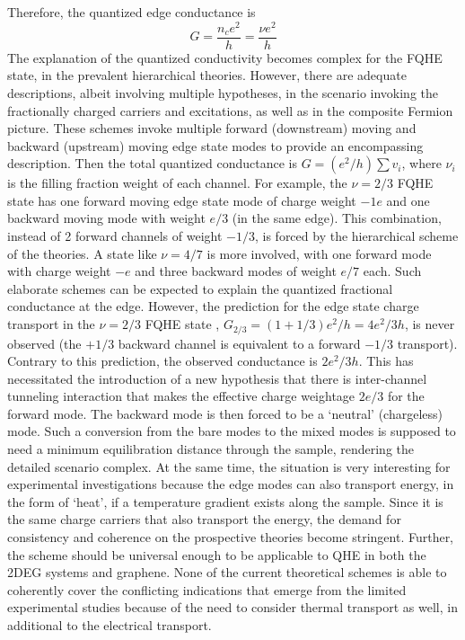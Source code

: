 \documentclass[aps,preprint,12pt,tightenlines]{revtex4}%
\begin{document}
Therefore, the quantized edge conductance is%
\begin{equation}
G=\frac{n_{c}e^{2}}{h}=\frac{\nu e^{2}}{h}%
\end{equation}
The explanation of the quantized conductivity becomes complex for the FQHE
state, in the prevalent hierarchical theories. However, there are adequate
descriptions, albeit involving multiple hypotheses, in the scenario invoking
the fractionally charged carriers and excitations, as well as in the composite
Fermion picture. These schemes invoke multiple forward (downstream) moving and
backward (upstream) moving edge state modes to provide an encompassing
description. Then the total quantized conductance is $G=\left(  e^{2}%
/h\right)  \sum v_{i}$, where $\nu_{i}$ is the filling fraction weight of each
channel. For example, the $\nu=2/3$ FQHE state has one forward moving edge
state mode of charge weight $-1e$ and one backward moving mode with weight
$e/3$ (in the same edge). This combination, instead of 2 forward channels of
weight $-1/3$, is forced by the hierarchical scheme of the theories. A state
like $\nu=4/7$ is more involved, with one forward mode with charge weight $-e$
and three backward modes of weight $e/7$ each. Such elaborate schemes can be
expected to explain the quantized fractional conductance at the edge. However,
the prediction for the edge state charge transport in the $\nu=2/3$ FQHE state
, $G_{2/3}=\left(  1+1/3\right)  e^{2}/h=4e^{2}/3h$, is never observed (the
$+1/3$ backward channel is equivalent to a forward $-1/3$ transport). Contrary
to this prediction, the observed conductance is $2e^{2}/3h$. This has
necessitated the introduction of a new hypothesis that there is inter-channel
tunneling interaction that makes the effective charge weightage $2e/3$ for the
forward mode. The backward mode is then forced to be a `neutral' (chargeless)
mode. Such a conversion from the bare modes to the mixed modes is supposed
to need a minimum equilibration distance through the sample, rendering the
detailed scenario complex. At the same time, the situation is very interesting
for experimental investigations because the edge modes can also transport
energy, in the form of `heat', if a temperature gradient exists along the
sample. Since it is the same charge carriers that also transport the energy,
the demand for consistency and coherence on the prospective theories become
stringent. Further, the scheme should be universal enough to be applicable to
QHE in both the 2DEG systems and graphene. None of the current theoretical
schemes is able to coherently cover the conflicting indications that emerge
from the limited experimental studies because of the need to consider thermal
transport as well, in additional to the electrical transport.
\end{document}
